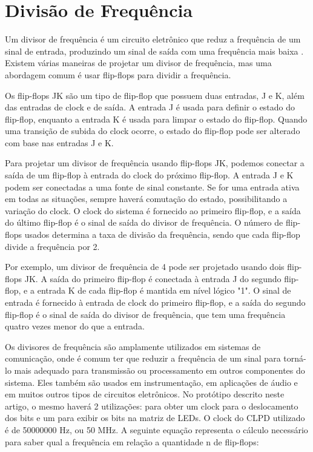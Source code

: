 \section{Divisão de Frequência}
\label{divisorDeFrequencia}
Um divisor de frequência é um circuito eletrônico que reduz a frequência de um sinal de entrada, produzindo um sinal de saída com uma frequência mais baixa \cite{gouveia2017divisor}. Existem várias maneiras de projetar um divisor de frequência, mas uma abordagem comum é usar flip-flops para dividir a frequência.

Os flip-flops JK são um tipo de flip-flop que possuem duas entradas, J e K, além das entradas de clock e de saída. A entrada J é usada para definir o estado do flip-flop, enquanto a entrada K é usada para limpar o estado do flip-flop. Quando uma transição de subida do clock ocorre, o estado do flip-flop pode ser alterado com base nas entradas J e K.

Para projetar um divisor de frequência usando flip-flops JK, podemos conectar a saída de um flip-flop à entrada do clock do próximo flip-flop. A entrada J e K podem ser conectadas a uma fonte de sinal constante. Se for uma entrada ativa em todas as situações, sempre haverá comutação do estado, possibilitando a variação do clock. O clock do sistema é fornecido ao primeiro flip-flop, e a saída do último flip-flop é o sinal de saída do divisor de frequência. O número de flip-flops usados determina a taxa de divisão da frequência, sendo que cada flip-flop divide a frequência por 2.

Por exemplo, um divisor de frequência de 4 pode ser projetado usando dois flip-flops JK. A saída do primeiro flip-flop é conectada à entrada J do segundo flip-flop, e a entrada K de cada flip-flop é mantida em nível lógico "1". O sinal de entrada é fornecido à entrada de clock do primeiro flip-flop, e a saída do segundo flip-flop é o sinal de saída do divisor de frequência, que tem uma frequência quatro vezes menor do que a entrada.

Os divisores de frequência são amplamente utilizados em sistemas de comunicação, onde é comum ter que reduzir a frequência de um sinal para torná-lo mais adequado para transmissão ou processamento em outros componentes do sistema. Eles também são usados em instrumentação, em aplicações de áudio e em muitos outros tipos de circuitos eletrônicos. No protótipo descrito neste artigo, o mesmo haverá 2 utilizações: para obter um clock para o deslocamento dos bits e um para exibir os bits na matriz de LEDs. O clock do CLPD utilizado é de 50000000 Hz, ou 50 MHz. A seguinte equação representa o cálculo necessário para saber qual a frequência em relação a quantidade n de flip-flops:

